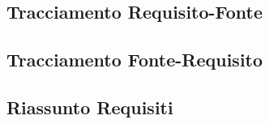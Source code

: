 \documentclass[a4paper,titlepage]{article}
\begin{document}
\newpage
\subsection{Tracciamento Requisito-Fonte}
\label{sub:Tracciamento Requisito-Fonte}


\newpage
\subsection{Tracciamento Fonte-Requisito}
\label{sub:Tracciamento Fonte-Requisito}


\newpage
\subsection{Riassunto Requisiti}
\label{sub:Riassunto Requisiti}

\end{document}
